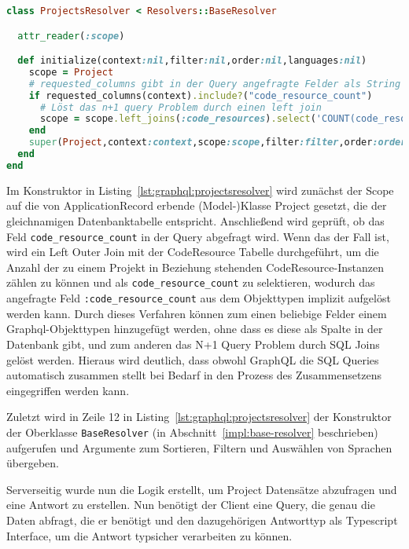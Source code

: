 \begin{lstlisting}[language=Ruby,float=h!,caption={Klasse zum Auflösung der Query \lstinline|:projects|. \lstinline|/graphql/resolvers/projects_resolver.rb|}, label={lst:graphql:projectsresolver}]
class ProjectsResolver < Resolvers::BaseResolver

  attr_reader(:scope)

  def initialize(context:nil,filter:nil,order:nil,languages:nil)
    scope = Project
    # requested_columns gibt in der Query angefragte Felder als String Array zurück
    if requested_columns(context).include?("code_resource_count")
      # Löst das n+1 query Problem durch einen left join
      scope = scope.left_joins(:code_resources).select('COUNT(code_resources) AS code_resource_count').group('projects.id')
    end
    super(Project,context:context,scope:scope,filter:filter,order:order,languages:languages,order_dir: "asc",order_field:"name")
  end
end
\end{lstlisting}

Im Konstruktor in Listing~\ref{lst:graphql:projectsresolver} wird zunächst der Scope auf die von ApplicationRecord erbende (Model-)Klasse Project gesetzt, die der gleichnamigen Datenbanktabelle entspricht. Anschließend wird geprüft, ob das Feld \texttt{code\_resource\_count} in der Query abgefragt wird. Wenn das der Fall ist, wird ein Left Outer Join mit der CodeResource Tabelle durchgeführt, um die Anzahl der zu einem Projekt in Beziehung stehenden CodeResource-Instanzen zählen zu können und als \texttt{code\_resource\_count} zu selektieren, wodurch das angefragte Feld \texttt{:code\_resource\_count} aus dem Objekttypen  implizit aufgelöst werden kann. Durch dieses Verfahren können zum einen beliebige Felder einem Graphql-Objekttypen hinzugefügt werden, ohne dass es diese als Spalte in der Datenbank gibt, und zum anderen das N+1 Query Problem durch SQL Joins gelöst werden. 
Hieraus wird deutlich, dass obwohl GraphQL die SQL Queries automatisch zusammen stellt bei Bedarf in den Prozess des Zusammensetzens eingegriffen werden kann.

Zuletzt wird in Zeile 12 in Listing~\ref{lst:graphql:projectsresolver} der Konstruktor der Oberklasse \texttt{BaseResolver} (in Abschnitt~\ref{impl:base-resolver} beschrieben) aufgerufen und  Argumente zum Sortieren, Filtern und Auswählen von Sprachen übergeben.

Serverseitig wurde nun die Logik erstellt, um Project Datensätze abzufragen und eine Antwort zu erstellen.
Nun benötigt der Client eine Query, die genau die Daten abfragt, die er benötigt und den dazugehörigen Antworttyp als Typescript Interface, um die Antwort typsicher verarbeiten zu können.

